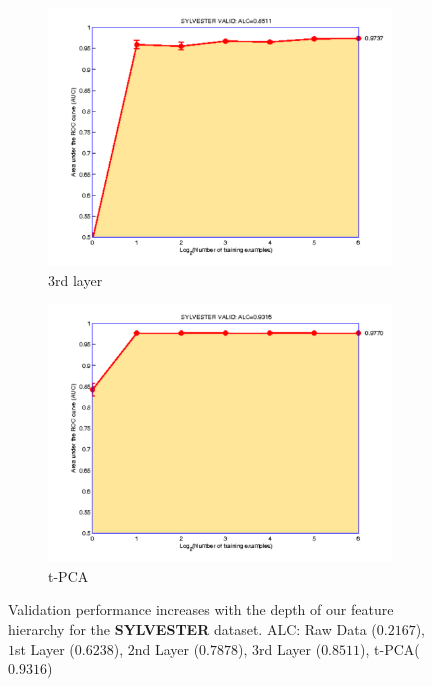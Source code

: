\begin{figure}
\begin{subfigure}{.3\textwidth}
\centering
\includegraphics[height=0.15\textheight,keepaspectratio]{article1/images/syl2.pdf}
\caption{3rd layer}
\end{subfigure}
\begin{subfigure}{.3\textwidth}
\centering
\includegraphics[height=0.15\textheight,keepaspectratio]{article1/images/syl3.pdf}
\caption{t-PCA}
\end{subfigure}
\caption{Validation performance increases with the depth of our feature
hierarchy for the {\bf SYLVESTER} dataset. ALC: Raw Data ($0.2167$), $1$st
Layer ($0.6238$), $2$nd Layer ($0.7878$), $3$rd Layer ($0.8511$),
t-PCA($0.9316$)}
\label{fig:sylvester}
\end{figure}




